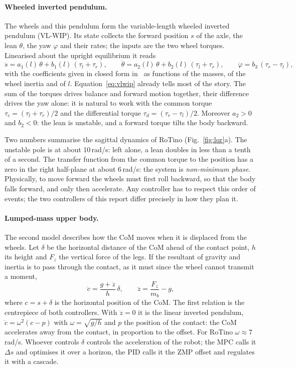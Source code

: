 \documentclass[11pt,a4paper]{article}
\newcommand{\tc}{\tau_c}
\newcommand{\td}{\tau_d}
\begin{document}
\paragraph{Wheeled inverted pendulum.} The wheels and this pendulum form the variable-length wheeled inverted
pendulum (VL-WIP). Its state collects the forward position $s$ of the axle, the lean $\theta$, the yaw $\varphi$ and
their rates; the inputs are the two wheel torques. Linearised about the upright equilibrium it reads
\begin{equation}
  \ddot s=a_1(l)\,\theta+b_1(l)\,(\tau_l+\tau_r),\qquad
  \ddot\theta=a_2(l)\,\theta+b_2(l)\,(\tau_l+\tau_r),\qquad
  \ddot\varphi=b_3\,(\tau_r-\tau_l),
  \label{eq:vlwip}
\end{equation}
with the coefficients given in closed form in~\cite{cui2022} as functions of the masses, of the wheel inertia and
of $l$. Equation~\eqref{eq:vlwip} already tells most of the story. The sum of the torques drives balance and
forward motion together, their difference drives the yaw alone: it is natural to work with the common torque
$\tc=(\tau_l+\tau_r)/2$ and the differential torque $\td=(\tau_r-\tau_l)/2$. Moreover $a_2>0$ and $b_2<0$: the
lean is unstable, and a forward torque tilts the body backward.

Two numbers summarise the sagittal dynamics of RoTino (Fig.~\ref{fig:lqr}a). The unstable pole is at about
10\,rad/s: left alone, a lean doubles in less than a tenth of a second. The transfer function from the common
torque to the position has a zero in the right half-plane at about 6\,rad/s: the system is \emph{non-minimum
phase}. Physically, to move forward the wheels must first roll backward, so that the body falls forward, and
only then accelerate. Any controller has to respect this order of events; the two controllers of this report differ
precisely in how they plan it.

\paragraph{Lumped-mass upper body.} The second model describes how the CoM moves when it is displaced from the
wheels. Let $\delta$ be the horizontal distance of the CoM ahead of the contact point, $h$ its height and $F_z$ the
vertical force of the legs. If the resultant of gravity and inertia is to pass through the contact, as it must
since the wheel cannot transmit a moment,
\begin{equation}
  \ddot c=\frac{g+\ddot z}{h}\,\delta,\qquad \ddot z=\frac{F_z}{m_b}-g ,
  \label{eq:lumped}
\end{equation}
where $c=s+\delta$ is the horizontal position of the CoM. The first relation is the centrepiece of both
controllers. With $\ddot z=0$ it is the linear inverted pendulum, $\ddot c=\omega^2(c-p)$ with $\omega=\sqrt{g/h}$
and $p$ the position of the contact: the CoM accelerates away from the contact, in proportion to the offset. For
RoTino $\omega\approx 7$\,rad/s. Whoever controls $\delta$ controls the acceleration of the robot; the MPC calls
it $\Delta s$ and optimises it over a horizon, the PID calls it the ZMP offset and regulates it with a cascade.
\end{document}
